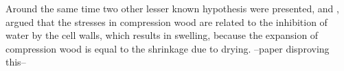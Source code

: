Around the same time two other lesser known hypothesis were presented, \cite{hejnowicz1967some} and \cite{brodzki1972}, argued that the stresses in compression
wood are related to the inhibition of water by the cell walls, which results in
swelling, because the expansion of compression wood is equal to the shrinkage
due to drying. --paper disproving this--